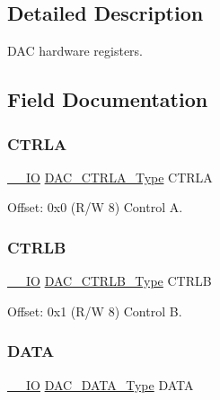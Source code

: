 \subsection{Detailed Description}
D\+AC hardware registers. 

\subsection{Field Documentation}
\mbox{\label{struct_dac_a63c3df9047d43c3d162f79612079a025}} 
\subsubsection{\texorpdfstring{CTRLA}{CTRLA}}
{\footnotesize\ttfamily \mbox{\hyperlink{core__cm0plus_8h_aec43007d9998a0a0e01faede4133d6be}{\+\_\+\+\_\+\+IO}} \mbox{\hyperlink{union_d_a_c___c_t_r_l_a___type}{D\+A\+C\+\_\+\+C\+T\+R\+L\+A\+\_\+\+Type}} C\+T\+R\+LA}



Offset\+: 0x0 (R/W 8) Control A. 

\mbox{\label{struct_dac_a74b22a8638d8b9b2d51e81a07e768280}} 
\subsubsection{\texorpdfstring{CTRLB}{CTRLB}}
{\footnotesize\ttfamily \mbox{\hyperlink{core__cm0plus_8h_aec43007d9998a0a0e01faede4133d6be}{\+\_\+\+\_\+\+IO}} \mbox{\hyperlink{union_d_a_c___c_t_r_l_b___type}{D\+A\+C\+\_\+\+C\+T\+R\+L\+B\+\_\+\+Type}} C\+T\+R\+LB}



Offset\+: 0x1 (R/W 8) Control B. 

\mbox{\label{struct_dac_a7148bbb7404231815d4954ef51204525}} 
\subsubsection{\texorpdfstring{DATA}{DATA}}
{\footnotesize\ttfamily \mbox{\hyperlink{core__cm0plus_8h_aec43007d9998a0a0e01faede4133d6be}{\+\_\+\+\_\+\+IO}} \mbox{\hyperlink{union_d_a_c___d_a_t_a___type}{D\+A\+C\+\_\+\+D\+A\+T\+A\+\_\+\+Type}} D\+A\+TA}



